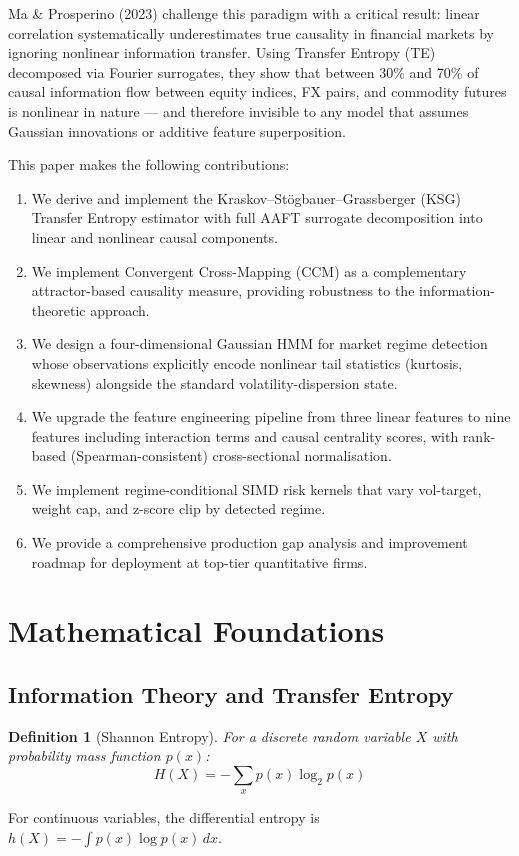 \documentclass[11pt]{article}
\newtheorem{definition}{Definition}
\begin{document}
Ma \& Prosperino (2023) challenge this paradigm with a critical result: linear correlation systematically underestimates true causality in financial markets by ignoring nonlinear information transfer. Using Transfer Entropy (TE) decomposed via Fourier surrogates, they show that between 30\% and 70\% of causal information flow between equity indices, FX pairs, and commodity futures is nonlinear in nature --- and therefore invisible to any model that assumes Gaussian innovations or additive feature superposition.

This paper makes the following contributions:
\begin{enumerate}
\item We derive and implement the Kraskov--St\"ogbauer--Grassberger (KSG) Transfer Entropy estimator with full AAFT surrogate decomposition into linear and nonlinear causal components.
\item We implement Convergent Cross-Mapping (CCM) as a complementary attractor-based causality measure, providing robustness to the information-theoretic approach.
\item We design a four-dimensional Gaussian HMM for market regime detection whose observations explicitly encode nonlinear tail statistics (kurtosis, skewness) alongside the standard volatility-dispersion state.
\item We upgrade the feature engineering pipeline from three linear features to nine features including interaction terms and causal centrality scores, with rank-based (Spearman-consistent) cross-sectional normalisation.
\item We implement regime-conditional SIMD risk kernels that vary vol-target, weight cap, and z-score clip by detected regime.
\item We provide a comprehensive production gap analysis and improvement roadmap for deployment at top-tier quantitative firms.
\end{enumerate}

\section{Mathematical Foundations}

\subsection{Information Theory and Transfer Entropy}

\begin{definition}[Shannon Entropy]
For a discrete random variable $X$ with probability mass function $p(x)$:
\begin{equation}
H(X) = -\sum_x p(x) \log_2 p(x)
\label{eq:shannon}
\end{equation}
\end{definition}
For continuous variables, the differential entropy is $h(X) = -\int p(x) \log p(x)\, dx$.
\end{document}
